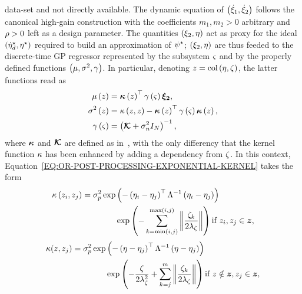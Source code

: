 data-set and not directly available. The dynamic equation of $\left( \dot{\xi}_1, \dot{\xi}_2 \right)$ follows the canonical high-gain construction
with the coefficients $m_1, m_2 > 0$ arbitrary and $\rho > 0$ left as a design parameter.
The quantities $\left( \xi_2, \eta \right)$ act as proxy for the ideal $\left( \dot{\eta}_d^{\star}, \eta^{\star} \right)$ required to build an approximation of $\psi^{\star}$;
$\left( \xi_2, \eta \right)$ are thus feeded to the discrete-time GP regressor represented by the subsystem $\varsigma$ and by the properly defined
functions $\left( \mu, \sigma^2, \gamma \right)$. In particular, denoting $z = \text{col} \left( {\eta, \zeta} \right)$, the latter functions read as
\begin{equation*}
   \begin{split}
      \mu \left( z \right) & = \boldsymbol{\kappa} \left( z \right)^{\top} \gamma \left( \varsigma \right) \boldsymbol{\xi_2}, \\
      \sigma^2 \left( z \right) & = \kappa \left( z, z \right) - \boldsymbol{\kappa} \left( z \right)^{\top} \gamma \left( \varsigma\right) \boldsymbol{\kappa} \left( z \right), \\
      \gamma \left( \varsigma \right) & = \left( \boldsymbol{\mathcal{K}} + \sigma_n^2 I_{N} \right)^{-1},
   \end{split}
\end{equation*}
where $\boldsymbol{\kappa}$ and $\boldsymbol{\mathcal{K}}$ are defined as in~,
with the only differency that the kernel function $\kappa$ has been enhanced by adding a dependency from $\zeta$.
In this context, Equation~\eqref{EQ:OR-POST-PROCESSING-EXPONENTIAL-KERNEL} takes the form
\begin{equation*}
   \begin{split}
      \kappa \left( z_i, z_j \right) = \sigma^2_p \exp & \left( - \left( \eta_i - \eta_j \right)^{\top} \Lambda^{-1} \left( \eta_i - \eta_j \right) \right) \\
        & \exp \left( -\sum_{k = \min(i, j)}^{\max(i, j)} \left \lVert {\frac{\zeta_k}{2 \lambda_{\zeta}}} \right \rVert \right) \text{if } z_i, z_j \in \boldsymbol{z},
   \end{split}
\end{equation*}
\begin{equation}%
   \label{EQ:OR-POST-PROCESSING-EXPONENTIAL-KERNEL-TIME-2}
   \begin{split}
      \kf(\cvar, \cvar_j) = \pvar_p \exp & \lp - \lp \im - \im_j \rp\T \Lambda^{-1} \lp \im - \im_j \rp \rp \\
        & \exp \lp - \frac{\clock}{2 \lambda_{\clock}^2} + \sum_{k = j}^{m} \norm{\frac{\clock_k}{2 \lambda_{\clock}}} \rp \text{if } \cvar \notin \bcvar, \cvar_j \in \bcvar,
   \end{split}
\end{equation}
